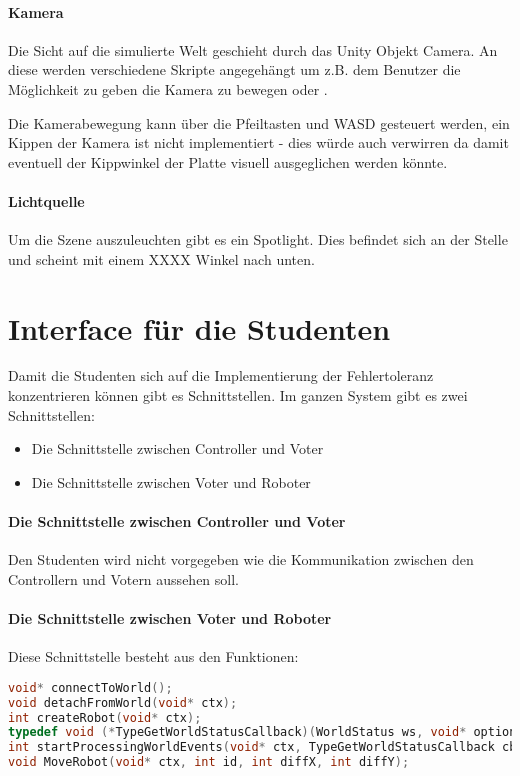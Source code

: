 \documentclass[
    12pt,
    bibliography=totoc,
    ngerman
]{scrartcl}
\begin{document}
\paragraph{Kamera} Die Sicht auf die simulierte Welt geschieht durch das Unity Objekt Camera. An diese werden verschiedene Skripte angegeh{\"{a}}ngt um z.B. dem Benutzer die M{\"{o}}glichkeit zu
geben die Kamera zu bewegen oder .

Die Kamerabewegung kann {\"{u}}ber die Pfeiltasten und WASD gesteuert werden, ein Kippen der Kamera ist nicht implementiert - dies w{\"{u}}rde auch verwirren da damit eventuell der Kippwinkel der
Platte visuell ausgeglichen werden k{\"{o}}nnte.

\paragraph{Lichtquelle} Um die Szene auszuleuchten gibt es ein Spotlight. Dies befindet sich an der Stelle  und scheint mit einem XXXX \textdegree Winkel nach unten.


\clearpage
\section{Interface f{\"{u}}r die Studenten}\label{interface}
Damit die Studenten sich auf die Implementierung der Fehlertoleranz konzentrieren k{\"{o}}nnen gibt es Schnittstellen.
Im ganzen System gibt es zwei Schnittstellen:
\begin{itemize}
\item Die Schnittstelle zwischen Controller und Voter
\item Die Schnittstelle zwischen Voter und Roboter
\end{itemize}

\paragraph{Die Schnittstelle zwischen Controller und Voter} Den Studenten wird nicht vorgegeben wie die Kommunikation zwischen den Controllern und Votern aussehen soll.

\paragraph{Die Schnittstelle zwischen Voter und Roboter} Diese Schnittstelle besteht aus den Funktionen:
\begin{lstlisting}[frame=single, language=c] 
void* connectToWorld();
void detachFromWorld(void* ctx);
int createRobot(void* ctx);
typedef void (*TypeGetWorldStatusCallback)(WorldStatus ws, void* optional);
int startProcessingWorldEvents(void* ctx, TypeGetWorldStatusCallback cb, void* optional);
void MoveRobot(void* ctx, int id, int diffX, int diffY);
\end{lstlisting}
\end{document}
